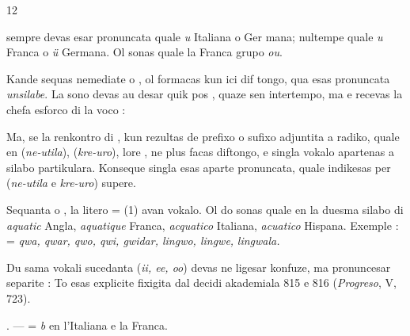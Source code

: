 \begin{VUpage}[16]{12}

 sempre devas esar pronuncata quale \textit{u} Italiana o Ger\cc
mana; nultempe quale \textit{u} Franca o \textit{ü} Germana. Ol sonas\nl
quale la Franca grupo \textit{ou}.

Kande  sequas nemediate  o , ol formacas kun ici dif\cc
tongo, qua esas pronuncata \textit{unsilabe}. La sono  devas au\cc
desar quik pos ,  quaze sen intertempo, ma  e recevas\nl
la chefa esforco di la voco : 

Ma, se la renkontro di ,  kun  rezultas de prefixo\nl
o sufixo adjuntita a radiko, quale en  (\textit{ne-utila}),\nl
{} (\textit{kre-uro}), lore ,  ne plus facas diftongo, e singla\nl
vokalo apartenas a silabo partikulara. Konseque singla esas\nl
aparte pronuncata, quale indikesas per (\textit{ne-utila} e \textit{kre-uro})\nl
supere.

\VUblancAlinea
Sequanta  o , la litero  =  (1) avan vokalo. Ol do\nl
sonas quale  en la duesma silabo di \textit{aquatic} Angla,\nl
\textit{aquatique} Franca, \textit{acquatico} Italiana, \textit{acuatico} Hispana.\nl
Exemple : \cc
{} = \textit{qwa, qwar, qwo, qwi, gwidar, lingwo, lingwe,}\nl
\textit{lingwala.}

Du sama vokali sucedanta (\textit{ii, ee, oo}) devas ne ligesar\nl
konfuze, ma pronuncesar separite : \nl
To esas explicite fixigita dal decidi akademiala 815 e 816\nl
(\textit{Progreso}, V, 723).

\VUblancAlinea
\VUsaut{6.49mm}
\VUsaut{3.65mm}

. ---  = \textit{b} en l'Italiana e la Franca.


\end{VUpage}
